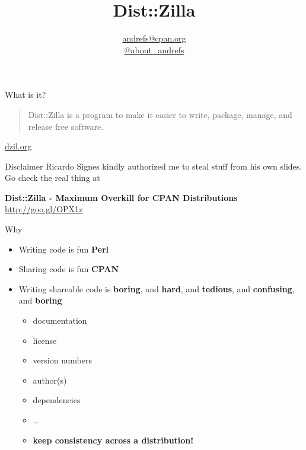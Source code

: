 \documentclass[serif,14pt,color=usenames,dvipsnames]{beamer}
\title{Dist::Zilla}
\author{\href{mailto:andrefs@cpan.org}{andrefs@cpan.org}\\\href{http://twitter.com/about\_andrefs}{@about\_andrefs}}
\institute{PtPW 2012, Braga}
\begin{document}
\begin{frame}
\maketitle
\end{frame}

\begin{frame}{What is it?}
\begin{quote}
Dist::Zilla is a program to make it easier to write, package, manage, and release free software.
\end{quote}
\vspace{-1cm}
\begin{flushright}
\url{dzil.org}
\end{flushright}



\end{frame}

\begin{frame}{Disclaimer}
	Ricardo Signes kindly authorized me to steal stuff from his own slides. Go check the real thing at
	\begin{center}
	{\large\textbf{Dist::Zilla - Maximum Overkill for CPAN Distributions}}\\
	\textcolor{purple}{\Large\url{http://goo.gl/OPX1z}}
	\end{center}
\end{frame}

\begin{frame}{Why}
\begin{itemize}
	\item Writing code is fun {\Large \Heart{} \textbf{Perl}}
	\pause                              
	\item Sharing code is fun {\Large \Heart{} \textbf{CPAN}}
	\pause
	\item Writing shareable code is \textbf{boring}\pause , and \textbf{hard}\pause , and \textbf{tedious}\pause, and \textbf{confusing}\pause , and \textbf{boring}
	\pause
	\begin{itemize}
		\item documentation
		\item license
		\item version numbers
		\item author(s)
		\item dependencies
	\pause
		\item \dots
	\pause
		\item \large\textbf{keep consistency across a distribution!}
	\end{itemize}
\end{itemize}
\end{frame}
\end{document}
